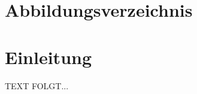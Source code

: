 \documentclass[a4paper,12pt,oneside]{article}
\begin{document}
  \newpage
  
  \tableofcontents
  
  \newpage
  \pagestyle{fancy} %
 
  \section*{Abbildungsverzeichnis}
  \renewcommand{\listfigurename}{} %
  \thispagestyle{empty}
  \listoffigures
  
  \newpage
  
  
  
  \newpage
  
  \section{Einleitung}\label{kap_einleitung}  
   TEXT FOLGT...
   
\end{document}
